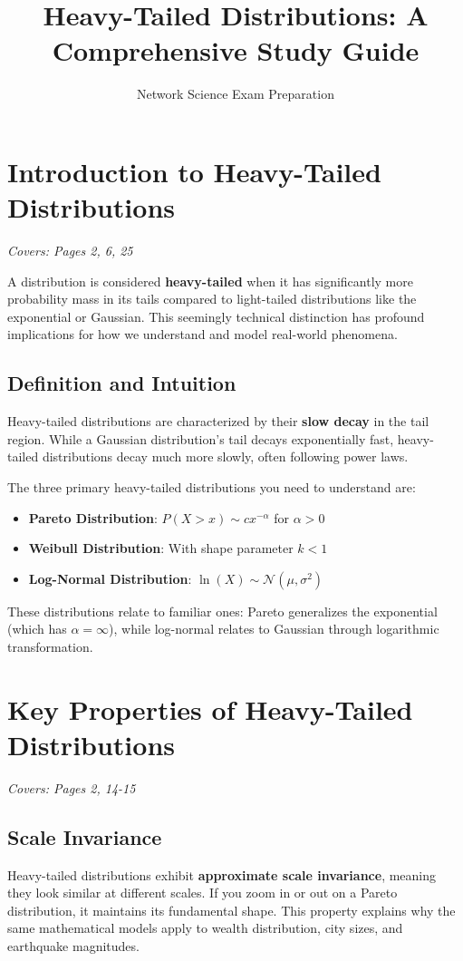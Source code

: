 \documentclass[11pt]{article}
\title{Heavy-Tailed Distributions: A Comprehensive Study Guide}
\author{Network Science Exam Preparation}
\date{}
\begin{document}
\maketitle

\section{Introduction to Heavy-Tailed Distributions}
\textit{Covers: Pages 2, 6, 25}

A distribution is considered \textbf{heavy-tailed} when it has significantly more probability mass in its tails compared to light-tailed distributions like the exponential or Gaussian. This seemingly technical distinction has profound implications for how we understand and model real-world phenomena.

\subsection{Definition and Intuition}
Heavy-tailed distributions are characterized by their \textbf{slow decay} in the tail region. While a Gaussian distribution's tail decays exponentially fast, heavy-tailed distributions decay much more slowly, often following power laws.

The three primary heavy-tailed distributions you need to understand are:
\begin{itemize}
    \item \textbf{Pareto Distribution}: $P(X > x) \sim cx^{-\alpha}$ for $\alpha > 0$
    \item \textbf{Weibull Distribution}: With shape parameter $k < 1$
    \item \textbf{Log-Normal Distribution}: $\ln(X) \sim \mathcal{N}(\mu, \sigma^2)$
\end{itemize}

These distributions relate to familiar ones: Pareto generalizes the exponential (which has $\alpha = \infty$), while log-normal relates to Gaussian through logarithmic transformation.

\section{Key Properties of Heavy-Tailed Distributions}
\textit{Covers: Pages 2, 14-15}

\subsection{Scale Invariance}
Heavy-tailed distributions exhibit \textbf{approximate scale invariance}, meaning they look similar at different scales. If you zoom in or out on a Pareto distribution, it maintains its fundamental shape. This property explains why the same mathematical models apply to wealth distribution, city sizes, and earthquake magnitudes.
\end{document}
